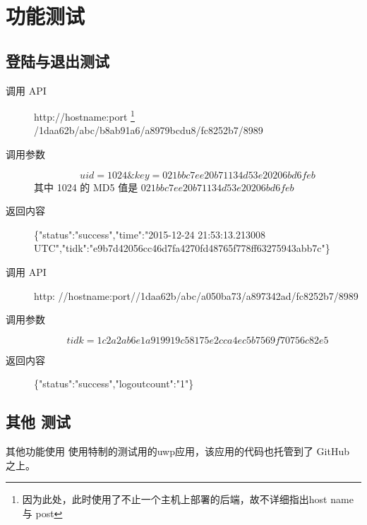 \documentclass[UTF8]{report}
\begin{document}
    \section{功能测试}
    \subsection{登陆与退出测试}
    \begin{description}
        \item[调用 API] http://hostname:port
        \footnote{因为此处，此时使用了不止一个主机上部署的后端，故不详细指出host name 与 post }
        /1daa62b/abc/b8ab91a6/a8979bcdu8/fc8252b7/8989
        \item[调用参数] $$uid=1024\&key=021bbc7ee20b71134d53e20206bd6feb$$
        其中 1024 的 MD5 值是 $021bbc7ee20b71134d53e20206bd6feb$
        \item[返回内容] \{"status":"success","time":"2015-12-24 21:53:13.213008 UTC","tidk":"e9b7d42056cc46d7fa4270fd48765f778ff63275943abb7c"\}        
    \end{description}
    \begin{description}
        \item[调用 API]
        http:       //hostname:port//1daa62b/abc/a050ba73/a897342ad/fc8252b7/8989
        \item[调用参数] $$tidk=1c2a2ab6e1a919919c58175e2cca4ec5b7569f70756c82e5$$
        \item[返回内容] \{"status":"success","logoutcount":"1"\}
    \end{description}
    \subsection{其他 测试}
    其他功能使用 使用特制的测试用的uwp应用，该应用的代码也托管到了 GitHub 之上。
\end{document}
